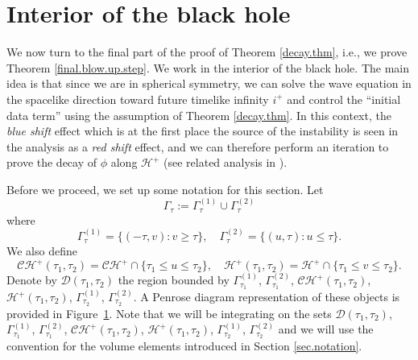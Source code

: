 \documentclass[12 pt, reqno]{amsart}
\theoremstyle{definition}
\theoremstyle{remark}
\numberwithin{equation}{section}
\newcommand{\set}[1]{\{#1\}}
\newcommand{\0}{\emptyset}
\newcommand{\Gmm}{\Gamma}
\newcommand{\calC}{\mathcal C}
\newcommand{\calD}{\mathcal D}
\newcommand{\calH}{\mathcal H}
\newcommand{\CH}{\calC \calH^{+}}		%
\newcommand{\EH}{\calH^{+}}
\begin{document}
\section{Interior of the black hole}\label{sec.interior}
We now turn to the final part of the proof of Theorem \ref{decay.thm}, i.e., we prove Theorem \ref{final.blow.up.step}. We work in the interior of the black hole. The main idea is that since we are in spherical symmetry, we can solve the wave equation in the spacelike direction toward future timelike infinity $i^+$ and control the ``initial data term'' using the assumption of Theorem \ref{decay.thm}. In this context, the \emph{blue shift} effect which is at the first place the source of the instability is seen in the analysis as a \emph{red shift} effect, and we can therefore perform an iteration to prove the decay of $\phi$ along $\mathcal H^+$ (see related analysis in \cite{DRS, DRdS}).

Before we proceed, we set up some notation for this section. Let
\begin{equation*}
	\Gmm_{\tau} := \Gmm^{(1)}_{\tau} \cup \Gmm^{(2)}_{\tau}
\end{equation*}
where
\begin{equation*}
	\Gmm^{(1)}_{\tau} = 	\set{(-\tau, v) : v \geq \tau}, \quad
	\Gmm^{(2)}_{\tau} = \set{(u, \tau) : u \leq \tau}.
\end{equation*}
We also define
\begin{equation*}
	\CH(\tau_{1}, \tau_{2}) = \CH \cap \set{\tau_{1} \leq u \leq \tau_{2}}, \quad
	\EH(\tau_{1}, \tau_{2}) = \EH \cap \set{\tau_{1} \leq v \leq \tau_{2}}.
\end{equation*}
Denote by $\calD(\tau_{1}, \tau_{2})$ the region bounded by $\Gmm^{(1)}_{\tau_{1}}$, $\Gmm^{(2)}_{\tau_{1}}$, $\CH(\tau_{1}, \tau_{2})$, $\EH(\tau_{1}, \tau_{2})$, $\Gmm^{(1)}_{\tau_{2}}$, $\Gmm^{(2)}_{\tau_{2}}$. A Penrose diagram representation of these objects is provided in Figure~\ref{fig:interior}. Note that we will be integrating on the sets $\calD(\tau_{1}, \tau_{2})$, $\Gmm^{(1)}_{\tau_{1}}$, $\Gmm^{(2)}_{\tau_{1}}$, $\CH(\tau_{1}, \tau_{2})$, $\EH(\tau_{1}, \tau_{2})$, $\Gmm^{(1)}_{\tau_{2}}$, $\Gmm^{(2)}_{\tau_{2}}$ and we will use the convention for the volume elements introduced in Section \ref{sec.notation}.

\begin{figure}[h]
\begin{center}
\def\svgwidth{220px}
 
\caption{} \label{fig:interior}
\end{center}
\end{figure}
\end{document}
